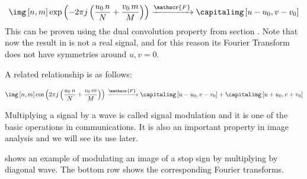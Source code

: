 
\begin{equation}
	\img \left[n,m \right]  \exp{ \left( -2\pi j \left( \frac{u_0\, n}{N} + \frac{v_0\, m}{M} \right) \right)}\xrightarrow{\mathscr{F}}
	\capitalimg \left[u-u_0,v-v_0 \right]
	\label{eq:modulation_exp}
\end{equation}
This can be proven using the dual convolution property from section \sect{\ref{section:dualconv}}.
Note that now the result in \eqn{\ref{eq:modulation_exp}} is not a real signal, and for this reason its Fourier Transform does not have symmetries around $u,v=0$.

A related relationship is as follows:

\begin{equation}
	\img \left[n,m \right]  \cos{ \left( 2\pi j \left( \frac{u_0\, n}{N} + \frac{v_0\, m}{M} \right) \right)}
	\xrightarrow{\mathscr{F}}
	\capitalimg \left[u-u_0,v-v_0 \right] + \capitalimg \left[u+u_0,v+v_0 \right]
\end{equation}

Multiplying a signal by a wave is called signal modulation and it is one of the basic operations in communications. It is also an important property in image analysis and we will see its use later.

\Fig{\ref{fig:modulation}} shows an example of modulating an image of a stop sign by multiplying by diagonal wave. The bottom row shows the corresponding Fourier transforms.



